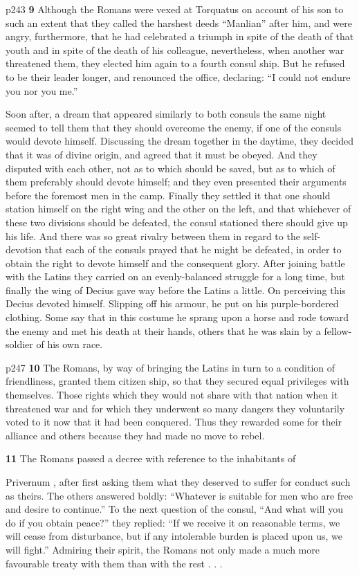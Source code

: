 p243
\textbf{9}
Although the Romans were vexed at Torquatus on account of his son to such an extent that they called the harshest deeds ``Manlian'' after him, and were angry, furthermore, that he had celebrated a triumph in spite of the death of that youth and in spite of the death of his colleague, nevertheless, when another war threatened them, they elected him again to a fourth consul ­ship. But he refused to be their leader longer, and renounced the office, declaring: ``I could not endure you nor you me.''

Soon after, a dream that appeared similarly to both consuls the same night seemed to tell them that they should overcome the enemy, if one of the consuls would devote himself. Discussing the dream together in the daytime, they decided that it was of divine origin, and agreed that it must be obeyed. And they disputed with each other, not as to which should be saved, but as to which of them preferably should devote himself; and they even presented their arguments before the foremost men in the camp. Finally they settled it that one should station himself on the right wing and the other on the left, and that whichever of these two divisions should be defeated, the consul stationed there should give up his life. And there was so great rivalry between them in regard to the self-devotion that each of the consuls prayed that he might be defeated, in order to obtain the right to devote himself and the consequent glory. After joining battle with the Latins they carried on an evenly-balanced struggle for a long time, but finally the wing of Decius gave way before the Latins a little. On perceiving this Decius devoted himself. Slipping off his armour, he put on his purple-bordered clothing. Some say that in this costume he sprang upon a horse and rode toward the enemy and met his death at their hands, others that he was slain by a fellow-soldier of his own race.

p247
\textbf{10}
The Romans, by way of bringing the Latins in turn to a condition of friendliness, granted them citizen ­ship, so that they secured equal privileges with themselves. Those rights which they would not share with that nation when it threatened war and for which they underwent so many dangers they voluntarily voted to it now that it had been conquered. Thus they rewarded some for their alliance and others because they had made no move to rebel.

\textbf{11}
The Romans passed a decree with reference to the inhabitants of

Privernum , after first asking them what they deserved to suffer for conduct such as theirs. The others answered boldly: ``Whatever is suitable for men who are free and desire to continue.'' To the next question of the consul, ``And what will you do if you obtain peace?'' they replied: ``If we receive it on reasonable terms, we will cease from disturbance, but if any intolerable burden is placed upon us, we will fight.'' Admiring their spirit, the Romans not only made a much more favourable treaty with them than with the rest . . .


